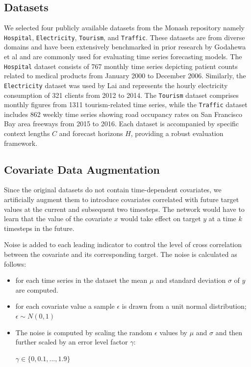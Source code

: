 \documentclass{article}
\newcommand{\horizon}{H}
\newcommand{\contextlength}{C}
\begin{document}
\subsection{Datasets}
We selected four publicly available datasets from the Monash repository \cite{DBLP:conf/nips/GodahewaBWHM21} 
namely \texttt{Hospital}, \texttt{Electricity}, \texttt{Tourism}, and \texttt{Traffic}. These datasets are from diverse domains and have 
been extensively benchmarked in prior research by Godahewa et al \cite{DBLP:conf/nips/GodahewaBWHM21} and are commonly used for evaluating time series 
forecasting models. The \texttt{Hospital} dataset consists of 767 monthly time series depicting patient counts related to 
medical products from January 2000 to December 2006. 
Similarly, the \texttt{Electricity} dataset was used by Lai \cite{lai2018modeling} and represents the hourly electricity 
consumption of 321 clients from 2012 to 2014. The \texttt{Tourism} dataset comprises monthly figures from 1311 tourism-related time series, 
while the \texttt{Traffic} dataset includes 862 weekly time series showing road occupancy rates on San 
Francisco Bay area freeways from 2015 to 2016. Each dataset is accompanied by specific context 
lengths $\contextlength$ and forecast horizons $\horizon$, providing a robust evaluation framework.

\subsection{Covariate Data Augmentation}
Since the original datasets do not contain time-dependent covariates, we artificially augment them 
to introduce covariates correlated with future target values at the current and subsequent two timesteps. 
The network would have to learn that the value of the covariate $x$
would take effect on target $y$ at a time $k$ timesteps in the future.

Noise is added to each leading indicator to control the level of cross correlation between the covariate and its 
corresponding target. The noise is calculated as follows: 

\begin{itemize}
\item for each time series in the dataset the mean $\mu$ and standard deviation $\sigma$ of $y$ are computed.
\item for each covariate value a sample $\epsilon$ is drawn from a unit normal distribution; $\epsilon \sim N(0,1)$ 
\item The noise is computed by scaling the random $\epsilon$ values by $\mu$ and $\sigma$ and then further
scaled by an error level factor $\gamma$:

$\gamma \in \{0, 0.1, ..., 1.9\}$
\end{itemize}
\end{document}
